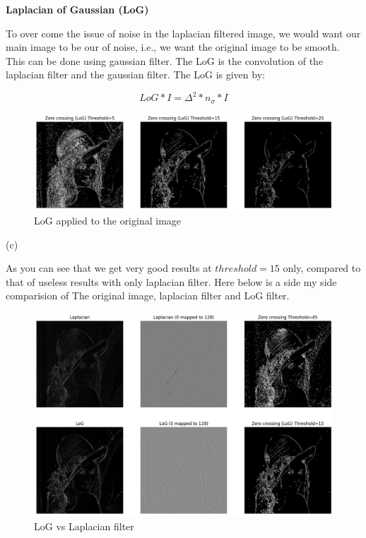 \textbf{Laplacian of Gaussian (LoG)}

To over come the issue of noise in the laplacian filtered image, we would want our main image to be our of noise, i.e., we want the original image to be smooth. This can be done using gaussian filter. The LoG is the convolution of the laplacian filter and the gaussian filter. The LoG is given by:

$$LoG*I = \Delta^2 * n_\sigma * I$$

\begin{figure}[H]
    \centering
    \includegraphics[width=1.06\textwidth]{res/3b_zero_crossing_log.png}
    \caption{LoG applied to the original image}
    \label{fig:3c_log}
\end{figure}

{\large(c)}

As you can see that we get very good results at $threshold=15$ only, compared to that of useless results with only laplacian filter. Here below is a side my side comparision of The original image, laplacian filter and LoG filter.

\begin{figure}
    \centering
    \includegraphics[width=1.06\textwidth]{res/3c_log_vs_lap.png}
    \caption{LoG vs Laplacian filter}
    \label{fig:3c_log_vs_lap}
\end{figure}